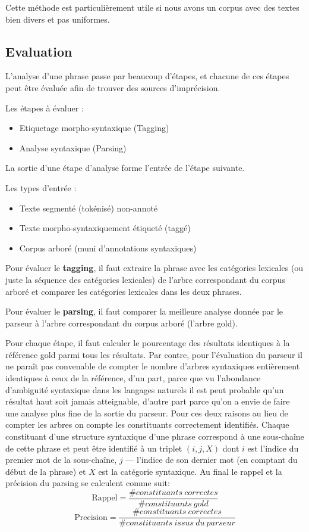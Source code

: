 \documentclass[12pt]{article}
\begin{document}
Cette m\'ethode est particuli\`erement utile si nous avons un corpus avec des
textes bien divers et pas uniformes.

\subsection{Evaluation}

L'analyse d'une phrase passe par beaucoup d'\'etapes, et chacune de ces \'etapes peut
\^etre \'evalu\'ee afin de trouver des sources d'impr\'ecision.\par

Les \'etapes \`a \'evaluer :
\begin{itemize}
\item Etiquetage morpho-syntaxique (Tagging)
\item Analyse syntaxique (Parsing)
\end{itemize}


La sortie d'une \'etape d'analyse forme l'entr\'ee de l'\'etape suivante.

Les types d'entr\'ee :
\begin{itemize}
\item Texte segment\'e (tok\'enis\'e) non-annot\'e
\item Texte morpho-syntaxiquement \'etiquet\'e (tagg\'e)
\item Corpus arbor\'e (muni d'annotations syntaxiques)
\end{itemize}

Pour \'evaluer le \textbf{tagging}, il faut extraire la phrase avec les cat\'egories
lexicales (ou juste la s\'equence des cat\'egories lexicales) de l'arbre
correspondant du corpus arbor\'e et comparer les cat\'egories lexicales dans les
deux phrases.\par

Pour \'evaluer le \textbf{parsing}, il faut comparer la meilleure analyse donn\'ee
par le parseur \`a l'arbre correspondant du corpus arbor\'e (l'arbre gold).

Pour chaque \'etape, il faut calculer le pourcentage des r\'esultats identiques \`a
la r\'ef\'erence gold parmi tous les r\'esultats. Par contre, pour
l'\'evaluation du parseur il ne para\^it pas convenable de compter le nombre
d'arbres syntaxiques enti\`erement identiques \`a ceux de la r\'ef\'erence, d'un part, parce que vu
l'abondance d'ambiguit\'e syntaxique dans les langages naturels il est peut
probable qu'un r\'esultat haut soit jamais atteignable, d'autre part parce qu'on
a envie de faire une analyse plus fine de la sortie du parseur. Pour ces deux
raisons au lieu de compter les arbres on compte les constituants correctement
identifi\'es. Chaque constituant d'une structure syntaxique d'une phrase
correspond \`a une sous-cha\^ine de cette phrase et peut \^etre identifi\'e \`a
un triplet $(i,j,X)$ dont $i$ est l'indice du premier mot de la sous-cha\^ine,
$j$ --- l'indice de son dernier mot (en comptant du d\'ebut de la phrase) et $X$
est la cat\'egorie syntaxique. Au final le rappel et la pr\'ecision du parsing
se calculent comme suit:
$$
\text{Rappel} = \frac{\#constituants\:correctes}{\#
constituants\:gold}
$$
$$
\text{Precision} = \frac{\#constituants\:correctes}{\#
constituants\:issus\:du\:parseur}
$$
\end{document}
